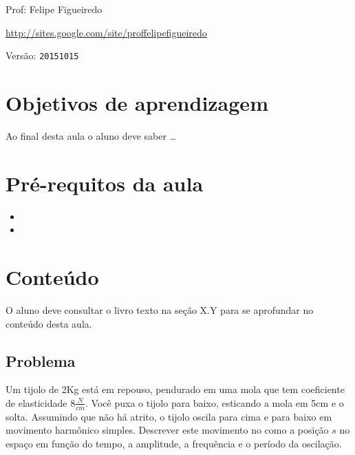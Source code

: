 \documentclass[a4paper]{article}
\begin{document}
\parbox[c]{.825\textwidth}{\raggedright%
{Prof: Felipe Figueiredo\par}
{\url{http://sites.google.com/site/proffelipefigueiredo}\par}
}

Versão: \verb|20151015|



\section{Objetivos de aprendizagem}

Ao final desta aula o aluno deve saber \ldots


\section{Pré-requitos da aula}

\begin{itemize}
\item 
\item 
\end{itemize}

\section{Conteúdo}

O aluno deve consultar o livro texto na seção X.Y para se aprofundar
no conteúdo desta aula.

\subsection{Problema}

Um tijolo de 2Kg está em repouso, pendurado em uma mola que tem
coeficiente de elasticidade 8$\frac{N}{cm}$. Você puxa o tijolo para
baixo, esticando a mola em 5cm e o solta. Assumindo que não há atrito,
o tijolo oscila para cima e para baixo em movimento harmônico
simples. Descrever este movimento no como a posição $s$ no espaço em
função do tempo, a amplitude, a frequência e o período da oscilação.
\end{document}
